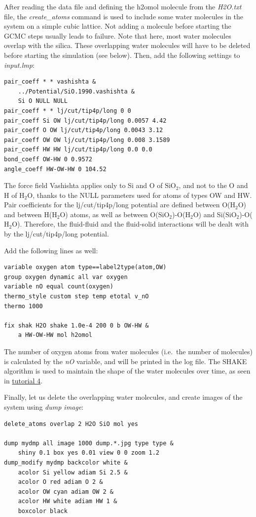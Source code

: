 \documentclass[9pt,tutorial]{livecoms}
\begin{document}
After reading the data file and defining the h2omol molecule from the \textit{H2O.txt}
file, the \textit{create\_atoms} command is used to include some water molecules
in the system on a simple cubic lattice. Not adding a molecule before starting
the GCMC steps usually leads to failure. Note that here, most water molecules
overlap with the silica. These overlapping water molecules will have to be
deleted before starting the simulation (see below). Then, add the following
settings to \textit{input.lmp}:
\begin{lstlisting}
pair_coeff * * vashishta &
    ../Potential/SiO.1990.vashishta &
    Si O NULL NULL
pair_coeff * * lj/cut/tip4p/long 0 0
pair_coeff Si OW lj/cut/tip4p/long 0.0057 4.42
pair_coeff O OW lj/cut/tip4p/long 0.0043 3.12
pair_coeff OW OW lj/cut/tip4p/long 0.008 3.1589
pair_coeff HW HW lj/cut/tip4p/long 0.0 0.0
bond_coeff OW-HW 0 0.9572
angle_coeff HW-OW-HW 0 104.52
\end{lstlisting}
The force field Vashishta applies only to Si and O of $\text{SiO}_2$,
and not to the O and H of $\text{H}_2\text{O}$, thanks to the NULL parameters
used for atoms of types OW and HW. Pair coefficients for the lj/cut/tip4p/long
potential are defined between O($\text{H}_2\text{O}$) and between H($\text{H}_2\text{O}$)
atoms, as well as between O($\text{SiO}_2$)-O($\text{H}_2\text{O}$) and
Si($\text{SiO}_2$)-O($\text{H}_2\text{O}$). Therefore, the fluid-fluid and the
fluid-solid interactions will be dealt with by the lj/cut/tip4p/long potential.

Add the following lines as well:
\begin{lstlisting}
variable oxygen atom type==label2type(atom,OW)
group oxygen dynamic all var oxygen
variable nO equal count(oxygen)
thermo_style custom step temp etotal v_nO
thermo 1000

fix shak H2O shake 1.0e-4 200 0 b OW-HW &
    a HW-OW-HW mol h2omol
\end{lstlisting}
The number of oxygen atoms from water molecules (i.e.~the number of molecules)
is calculated by the \textit{nO} variable, and will be printed in the log file.
The SHAKE algorithm is used to maintain the shape of the water molecules over time,
as seen in \hyperref[sheared-confined-label]{tutorial 4}.

Finally, let us delete the overlapping water molecules, and create images
of the system using \textit{dump image}:
\begin{lstlisting}
delete_atoms overlap 2 H2O SiO mol yes

dump mydmp all image 1000 dump.*.jpg type type &
    shiny 0.1 box yes 0.01 view 0 0 zoom 1.2
dump_modify mydmp backcolor white &
    acolor Si yellow adiam Si 2.5 &
    acolor O red adiam O 2 &
    acolor OW cyan adiam OW 2 &
    acolor HW white adiam HW 1 &
    boxcolor black
\end{lstlisting}
\end{document}
